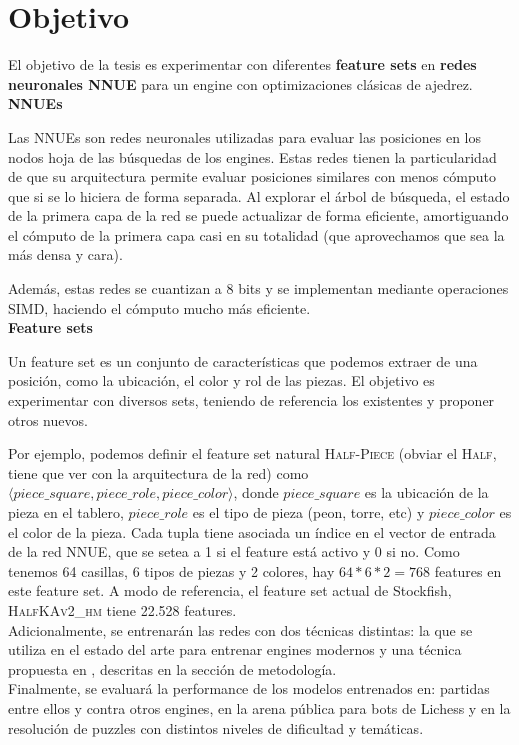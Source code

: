 \newpage
\section*{Objetivo}

El objetivo de la tesis es experimentar con diferentes \textbf{feature sets} en \textbf{redes neuronales NNUE} para un engine con optimizaciones clásicas de ajedrez. \\

\textbf{NNUEs}

Las NNUEs son redes neuronales utilizadas para evaluar las posiciones en los nodos hoja de las búsquedas de los engines. Estas redes tienen la particularidad de que su arquitectura permite evaluar posiciones similares con menos cómputo que si se lo hiciera de forma separada. Al explorar el árbol de búsqueda, el estado de la primera capa de la red se puede actualizar de forma eficiente, amortiguando el cómputo de la primera capa casi en su totalidad (que aprovechamos que sea la más densa y cara).

Además, estas redes se cuantizan a 8 bits y se implementan mediante operaciones SIMD, haciendo el cómputo mucho más eficiente. \\

\textbf{Feature sets}

Un feature set es un conjunto de características que podemos extraer de una posición, como la ubicación, el color y rol de las piezas. El objetivo es experimentar con diversos sets, teniendo de referencia los existentes y proponer otros nuevos.

Por ejemplo, podemos definir el feature set natural \textsc{Half-Piece} (obviar el \textsc{Half}, tiene que ver con la arquitectura de la red) como $\langle piece\_square, piece\_role, piece\_color \rangle$, donde $piece\_square$ es la ubicación de la pieza en el tablero, $piece\_role$ es el tipo de pieza (peon, torre, etc) y $piece\_color$ es el color de la pieza. Cada tupla tiene asociada un índice en el vector de entrada de la red NNUE, que se setea a 1 si el feature está activo y 0 si no. Como tenemos 64 casillas, 6 tipos de piezas y 2 colores, hay $64*6*2=768$ features en este feature set.
A modo de referencia, el feature set actual de Stockfish, \textsc{HalfKAv2\_hm} tiene 22.528 features. \\

Adicionalmente, se entrenarán las redes con dos técnicas distintas: la que se utiliza en el estado del arte para entrenar engines modernos y una técnica propuesta en \cite{dlchess:2014}, descritas en la sección de metodología. \\

Finalmente, se evaluará la performance de los modelos entrenados en: partidas entre ellos y contra otros engines, en la arena pública para bots de Lichess y en la resolución de puzzles con distintos niveles de dificultad y temáticas.
